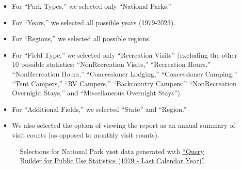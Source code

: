 \documentclass[
  letterpaper,
  DIV=11,
  numbers=noendperiod]{scrartcl}
\providecommand{\tightlist}{%
  \setlength{\itemsep}{0pt}\setlength{\parskip}{0pt}}\usepackage{longtable,booktabs,array}
\begin{document}
\begin{itemize}
\tightlist
\item
  For ``Park Types,'' we selected only ``National Parks.''
\item
  For ``Years,'' we selected all possible years (1979-2023).
\item
  For ``Regions,'' we selected all possible regions.
\item
  For ``Field Type,'' we selected only ``Recreation Visits'' (excluding
  the other 10 possible statistics: ``NonRecreation Visits,''
  ``Recreation Hours,'' ``NonRecreation Hours,'' ``Concessioner
  Lodging,'' ``Concessioner Camping,'' ``Tent Campers,'' ``RV Campers,''
  ``Backcountry Campers,'' ``NonRecreation Overnight Stays,'' and
  ``Miscellaneous Overnight Stays'').
\item
  For ``Additional Fields,'' we selected ``State'' and ``Region.''
\item
  We also selected the option of viewing the report as an annual summary
  of visit counts (as opposed to monthly visit counts).
\end{itemize}

\begin{figure}


\caption{\label{fig-query-builder}Selections for National Park visit
data generated with
\href{https://irma.nps.gov/Stats/SSRSReports/National\%20Reports/Query\%20Builder\%20for\%20Public\%20Use\%20Statistics\%20(1979\%20-\%20Last\%20Calendar\%20Year)}{``Query
Builder for Public Use Statistics (1979 - Last Calendar Year)''}.}

\end{figure}%
\end{document}
